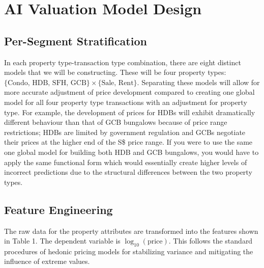 \section{AI Valuation Model Design}
\label{sec:model_design}

\subsection{Per-Segment Stratification}

In each property type-transaction type combination, there are eight distinct 
models that we will be constructing. These will be four property types: 
$\{\text{Condo, HDB, SFH, GCB}\} \times \{\text{Sale, Rent}\}$. Separating 
these models will allow for more accurate adjustment of price development 
compared to creating one global model for all four property type transactions 
with an adjustment for property type. For example, the development of prices 
for HDBs will exhibit dramatically different behaviour than that of GCB 
bungalows because of price range restrictions; HDBs are limited by government 
regulation and GCBs negotiate their prices at the higher end of the S\$ price 
range. If you were to use the same one global model for building both HDB and 
GCB bungalows, you would have to apply the same functional form which would 
essentially create higher levels of incorrect predictions due to the 
structural differences between the two property types.

\subsection{Feature Engineering}

The raw data for the property attributes are transformed into the features shown in Table 1. The dependent variable is $\log_{10}(\text{price})$. This follows the standard procedures of hedonic pricing models for stabilizing variance and mitigating the influence of extreme values.

